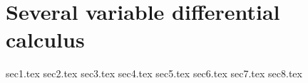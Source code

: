\chapter{Several variable differential calculus}\label{ii:ch:6}

{sec1.tex}
{sec2.tex}
{sec3.tex}
{sec4.tex}
{sec5.tex}
{sec6.tex}
{sec7.tex}
{sec8.tex}
